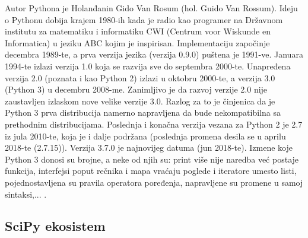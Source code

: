 \documentclass[12pt,oneside]{memoir}
\begin{document}
Autor Pythona je Holanđanin Gido Van Rosum (hol. Guido Van Rossum). Ideju o Pythonu dobija krajem 1980-ih kada je radio kao programer na Državnom institutu za matematiku i informatiku CWI (Centrum voor Wiskunde en Informatica) u jeziku ABC kojim je inspirisan. Implementaciju započinje decembra 1989-te, a prva verzija jezika (verzija 0.9.0) puštena je 1991-ve. Januara 1994-te izlazi verzija 1.0 koja se razvija sve do septembra 2000-te. Unapređena verzija 2.0 (poznata i kao Python 2) izlazi u oktobru 2000-te, a verzija 3.0 (Python 3) u decembru 2008-me. Zanimljivo je da razvoj verzije 2.0 nije zaustavljen izlaskom nove velike verzije 3.0. Razlog za to je činjenica da je Python 3 prva distribucija namerno napravljena da bude nekompatibilna sa prethodnim distribucijama. Poslednja i konačna verzija vezana za Python 2 je 2.7 iz jula 2010-te, koja je i dalje podržana (poslednja promena desila se u aprilu 2018-te (2.7.15)). Verzija 3.7.0 je najnovijeg datuma (jun 2018-te). Izmene koje Python 3 donosi su brojne, a neke od njih su: print više nije naredba već postaje funkcija, interfejsi poput rečnika i mapa vraćaju poglede i iteratore umesto listi, pojednostavljena su pravila operatora poređenja, napravljene su promene u samoj sintaksi,...  \cite{python-history, python-dates, python-whats-new}.

\subsection{SciPy ekosistem}
 
\end{document}
